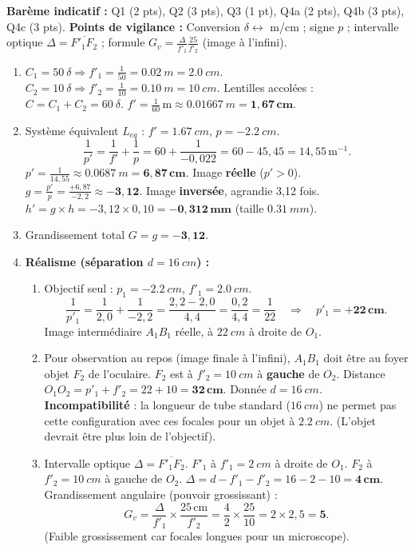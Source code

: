 \documentclass[11pt]{article}
\begin{document}
\begin{corrige}
\textbf{Barème indicatif :} Q1 (2 pts), Q2 (3 pts), Q3 (1 pt), Q4a (2 pts), Q4b (3 pts), Q4c (3 pts).
\textbf{Points de vigilance :} Conversion $\delta \leftrightarrow$ m/cm ; signe $p$ ; intervalle optique $\Delta = \overline{F'_1F_2}$ ; formule $G_v = \frac{\Delta}{f'_1}\frac{25}{f'_2}$ (image à l'infini).
\begin{enumerate}
    \item $C_1 = \SI{+50}{\delta} \Rightarrow f'_1 = \frac{1}{50} = \SI{0,02}{m} = \SI{2,0}{cm}$.
    $C_2 = \SI{+10}{\delta} \Rightarrow f'_2 = \frac{1}{10} = \SI{0,10}{m} = \SI{10}{cm}$.
    Lentilles accolées : $C = C_1 + C_2 = \SI{+60}{\delta}$.
    $f' = \frac{1}{60}\,\text{m} \approx \SI{0,01667}{m} = \mathbf{1,67\,cm}$.
    \item Système équivalent $L_{eq}$ : $f' = \SI{1,67}{cm}$, $p = \SI{-2,2}{cm}$.
    \[ \frac{1}{p'} = \frac{1}{f'} + \frac{1}{p} = 60 + \frac{1}{-0,022} = 60 - 45,45 = 14,55\,\text{m}^{-1}. \]
    $p' = \frac{1}{14,55} \approx \SI{0,0687}{m} = \mathbf{6,87\,cm}$.
    Image \textbf{réelle} ($p'>0$).
    $g = \frac{p'}{p} = \frac{+6,87}{-2,2} \approx \mathbf{-3,12}$.
    Image \textbf{inversée}, agrandie 3,12 fois.
    $h' = g \times h = -3,12 \times 0,10 = \mathbf{-0,312\,mm}$ (taille $\SI{0,31}{mm}$).
    \item Grandissement total $G = g = \mathbf{-3,12}$.
    \item \textbf{Réalisme (séparation $d=\SI{16}{cm}$) :}
    \begin{enumerate}
        \item Objectif seul : $p_1 = \SI{-2,2}{cm}$, $f'_1 = \SI{2,0}{cm}$.
        \[ \frac{1}{p'_1} = \frac{1}{2,0} + \frac{1}{-2,2} = \frac{2,2 - 2,0}{4,4} = \frac{0,2}{4,4} = \frac{1}{22} \quad\Rightarrow\quad p'_1 = \mathbf{+22\,cm}. \]
        Image intermédiaire $A_1B_1$ réelle, à $\SI{22}{cm}$ à droite de $O_1$.
        \item Pour observation au repos (image finale à l'infini), $A_1B_1$ doit être au foyer objet $F_2$ de l'oculaire.
        $F_2$ est à $f'_2 = \SI{10}{cm}$ à \textbf{gauche} de $O_2$.
        Distance $O_1O_2 = p'_1 + f'_2 = 22 + 10 = \mathbf{32\,cm}$.
        Donnée $d = \SI{16}{cm}$. \textbf{Incompatibilité} : la longueur de tube standard ($\SI{16}{cm}$) ne permet pas cette configuration avec ces focales pour un objet à $\SI{2,2}{cm}$. (L'objet devrait être plus loin de l'objectif).
        \item Intervalle optique $\Delta = \overline{F'_1F_2}$.
        $F'_1$ à $f'_1=\SI{2}{cm}$ à droite de $O_1$. $F_2$ à $f'_2=\SI{10}{cm}$ à gauche de $O_2$.
        $\Delta = d - f'_1 - f'_2 = 16 - 2 - 10 = \mathbf{4\,cm}$.
        Grandissement angulaire (pouvoir grossissant) :
        \[ G_v = \frac{\Delta}{f'_1} \times \frac{25\,\text{cm}}{f'_2} = \frac{4}{2} \times \frac{25}{10} = 2 \times 2,5 = \mathbf{5}. \]
        (Faible grossissement car focales longues pour un microscope).
    \end{enumerate}
\end{enumerate}
\end{corrige}
\end{document}
